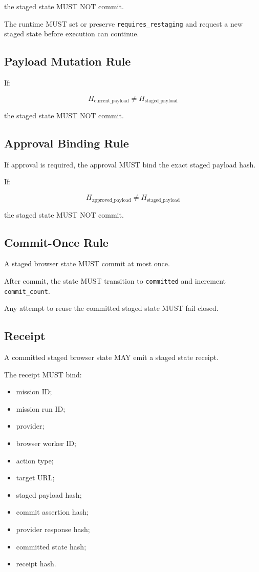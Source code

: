 the staged state MUST NOT commit.

The runtime MUST set or preserve \texttt{requires\_restaging} and request a new staged state before execution can continue.

\subsection{Payload Mutation Rule}

If:

\begin{equation}
H_{\mathrm{current\_payload}} \neq H_{\mathrm{staged\_payload}}
\end{equation}

the staged state MUST NOT commit.

\subsection{Approval Binding Rule}

If approval is required, the approval MUST bind the exact staged payload hash.

If:

\begin{equation}
H_{\mathrm{approved\_payload}} \neq H_{\mathrm{staged\_payload}}
\end{equation}

the staged state MUST NOT commit.

\subsection{Commit-Once Rule}

A staged browser state MUST commit at most once.

After commit, the state MUST transition to \texttt{committed} and increment \texttt{commit\_count}.

Any attempt to reuse the committed staged state MUST fail closed.

\subsection{Receipt}

A committed staged browser state MAY emit a staged state receipt.

The receipt MUST bind:

\begin{itemize}
  \item mission ID;
  \item mission run ID;
  \item provider;
  \item browser worker ID;
  \item action type;
  \item target URL;
  \item staged payload hash;
  \item commit assertion hash;
  \item provider response hash;
  \item committed state hash;
  \item receipt hash.
\end{itemize}

